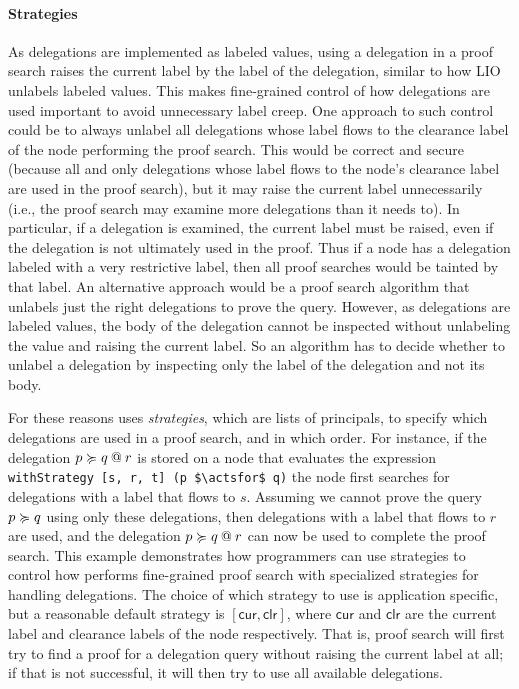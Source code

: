 \paragraph{Strategies}
As delegations are implemented as labeled values, using a delegation in a proof search raises the current label by the label of the delegation, similar to how LIO unlabels labeled values. This makes fine-grained control of how delegations are used important to avoid unnecessary label creep. One approach to such control could be to always unlabel all delegations whose label flows to the clearance label of the node performing the proof search. This would be correct and secure (because all and only delegations whose label flows to the node's clearance label are used in the proof search), but it may raise the current label unnecessarily (i.e., the proof search may examine more delegations than it needs to). In particular, if a delegation is examined, the current label must be raised, even if the delegation is not ultimately used in the proof. Thus if a node has a delegation labeled with a very restrictive label, then all proof searches would be tainted by that label.
An alternative approach would be a proof search algorithm that unlabels just the right delegations to prove the query. However, as delegations are labeled values, the body of the delegation cannot be inspected without unlabeling the value and raising the current label. So an algorithm has to decide whether to unlabel a delegation by inspecting only the label of the delegation and not its body.

For these reasons \lang{} uses \emph{strategies}, which are lists of principals, to specify which delegations are used in a proof search, and in which order. For instance, if the delegation $\lb{r}{p \actsfor q}$ is stored on a node that evaluates the expression \lstinline[mathescape]!withStrategy [s, r, t] (p $\actsfor$ q)! the node first searches for delegations with a label that flows to $s$. Assuming we cannot prove the query $p \actsfor q$ using only these delegations, then delegations with a label that flows to $r$ are used, and the delegation $\lb{r}{p \actsfor q}$ can now be used to complete the proof search. This example demonstrates how programmers can use strategies to control how \lang{} performs fine-grained proof search with specialized strategies for handling delegations. The choice of which strategy to use is application specific, but a reasonable default strategy is $[\mathsf{cur}, \mathsf{clr}]$, where $\mathsf{cur}$ and $\mathsf{clr}$ are the current label and clearance labels of the node respectively. That is, proof search will first try to find a proof for a delegation query without raising the current label at all; if that is not successful, it will then try to use all available delegations.

